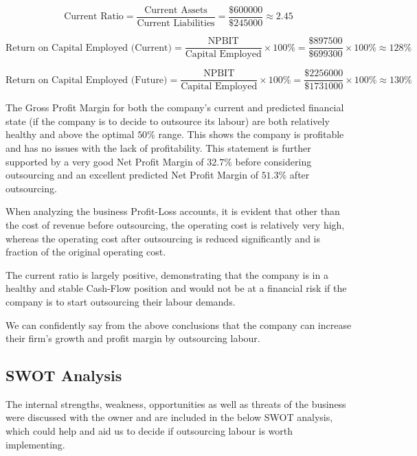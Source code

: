 
	$$\text{Current Ratio} = \frac{\text{Current Assets}}{\text{Current Liabilities}} = \frac{\$600000}{\$245000} \approx 2.45$$
	

	$$\text{Return on Capital Employed (Current)} = \frac{\text{NPBIT}}{\text{Capital Employed}}\times 100\% = \frac{\$897500}{\$699300}\times 100\% \approx 128\%$$
	

	$$\text{Return on Capital Employed (Future)} = \frac{\text{NPBIT}}{\text{Capital Employed}}\times 100\% = \frac{\$2256000}{\$1731000}\times 100\% \approx 130\%$$

	{The Gross Profit Margin for both the company's current and predicted financial state (if the company is to decide to outsource its labour) are both relatively healthy and above the optimal $50\%$ range. This shows the company is profitable and has no issues with the lack of profitability. This statement is further supported by a very good Net Profit Margin of $32.7\%$ before considering outsourcing and an excellent predicted Net Profit Margin of $51.3\%$ after outsourcing.}
	
	{When analyzing the business Profit-Loss accounts, it is evident that other than the cost of revenue before outsourcing, the operating cost is relatively very high, whereas the operating cost after outsourcing is reduced significantly and is fraction of the original operating cost.}
	
	{The current ratio is largely positive, demonstrating that the company is in a healthy and stable Cash-Flow position and would not be at a financial risk if the company is to start outsourcing their labour demands.}	
	
	{We can confidently say from the above conclusions that the company can  increase their firm's growth and profit margin by outsourcing labour.}

\subsection{SWOT Analysis}

	{The internal strengths, weakness, opportunities as well as threats of the business were discussed with the owner and are included in the below SWOT analysis, which could help and aid us to decide if outsourcing labour is worth implementing.}
	
